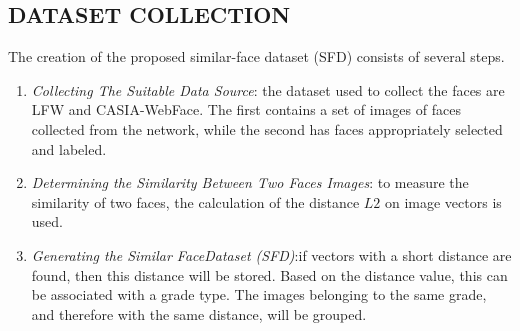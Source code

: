 \subsection{DATASET COLLECTION}
The creation of the proposed similar-face dataset (SFD) consists of several steps.
\begin{enumerate}
    \item \emph{Collecting The Suitable Data Source}: the dataset used to collect the faces are LFW and CASIA-WebFace. The first contains a set of images of faces collected from the network, while the second has faces appropriately selected and labeled.
    \item \emph{Determining the Similarity Between Two Faces Images}: to measure the similarity of two faces, the calculation of the distance $L2$ on image vectors is used.
    \item \emph{Generating the Similar FaceDataset (SFD)}:if vectors with a short distance are found, then this distance will be stored. Based on the distance value, this can be associated with a grade type. The images belonging to the same grade, and therefore with the same distance, will be grouped.
\end{enumerate}
